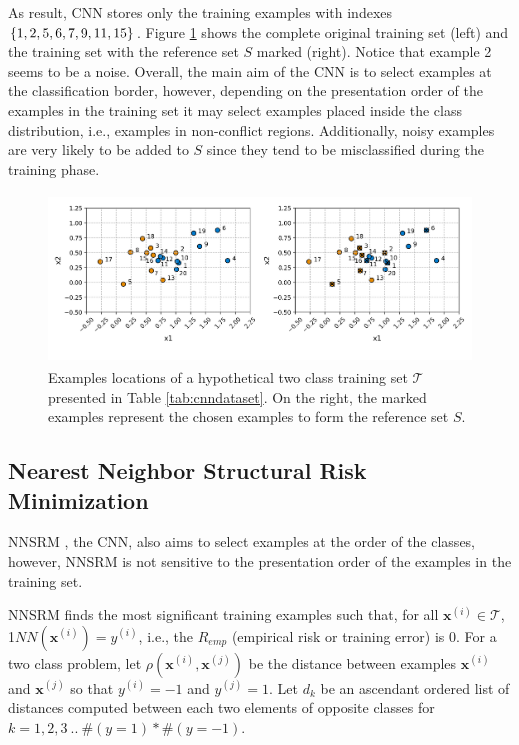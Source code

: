 \vspace{0.4cm}

As result, CNN stores only the training examples with indexes $\{1,2,5,\\6,7,9,11,15\}$. Figure \ref{fig:cnndataset} shows the complete original training set (left) and the training set with the reference set $S$ marked (right). Notice that example 2 seems to be a noise. Overall, the main aim of the CNN is to select examples at the classification border, however, depending on the presentation order of the examples in the training set it may select examples placed inside the class distribution, i.e., examples in non-conflict regions. Additionally, noisy examples are very likely to be added to $S$ since they tend to be misclassified during the training phase.%

\begin{figure}[h]
    \centering
    \includegraphics[height = 4.5cm, width =  12cm]{figures/cnndataset.png}
    \caption{Examples locations of a hypothetical two class training set $\mathcal{T}$ presented in Table \ref{tab:cnndataset}. On the right, the marked examples represent the chosen examples to form the reference set $S$.}
    \label{fig:cnndataset}
\end{figure}

\subsection{Nearest Neighbor Structural Risk Minimization}

NNSRM \cite{nnsrm:2003}, the CNN, also aims to select examples at the order of the classes, however, NNSRM is not sensitive to the presentation order of the examples in the training set. 

NNSRM finds the most significant training examples such that, for all $\mathbf{x}^{(i)} \in \mathcal{T}$, 1$NN(\mathbf{x}^{(i)}) = y^{(i)}$, i.e., the $R_{emp}$ (empirical risk or training error) is 0. For a two class problem, let $\rho(\mathbf{x}^{(i)},\mathbf{x}^{(j)})$ be the distance between examples $\mathbf{x}^{(i)}$ and $\mathbf{x}^{(j)}$ so that $y^{(i)} = -1$ and $y^{(j)} = 1$. Let $d_k$ be an ascendant ordered list of distances computed between each two elements of opposite classes for $k = 1, 2, 3 \: .. \: \#(y=1) * \#(y=-1)$.

